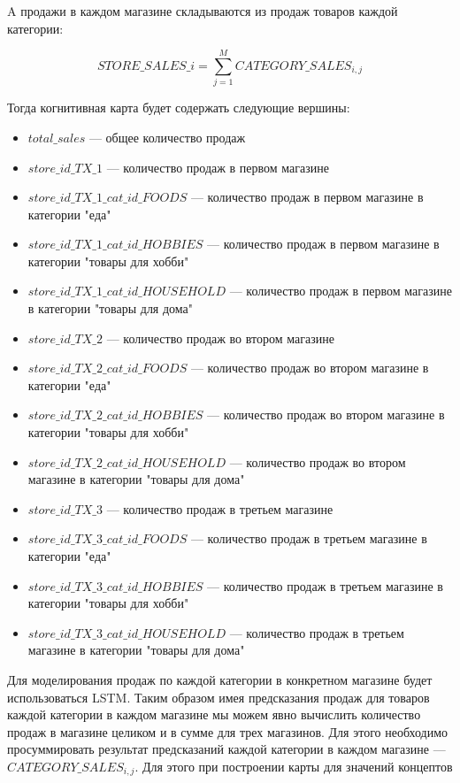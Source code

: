 \noindent A продажи в каждом магазине складываются из продаж
товаров каждой категории:

\begin{equation}\label{eq:store_sales_simple_model}
	STORE\_SALES\_{i} = \sum_{j=1}^{M} CATEGORY\_SALES_{i,j}
\end{equation}

Тогда когнитивная карта будет содержать следующие вершины:

\begin{itemize}
	\item $ total\_sales $ --- общее количество продаж
	\item $ store\_id\_TX\_1 $ --- количество продаж в первом магазине
	\item $ store\_id\_TX\_1\_cat\_id\_FOODS $ --- количество продаж в первом магазине в категории "еда"
	\item $ store\_id\_TX\_1\_cat\_id\_HOBBIES $ --- количество продаж в первом магазине в категории "товары для хобби"
	\item $ store\_id\_TX\_1\_cat\_id\_HOUSEHOLD $ --- количество продаж в первом магазине в категории "товары для дома"
	\item $ store\_id\_TX\_2 $ --- количество продаж во втором магазине
	\item $ store\_id\_TX\_2\_cat\_id\_FOODS $ --- количество продаж во втором магазине в категории "еда"
	\item $ store\_id\_TX\_2\_cat\_id\_HOBBIES $ --- количество продаж во втором магазине в категории "товары для хобби"
	\item $ store\_id\_TX\_2\_cat\_id\_HOUSEHOLD $ --- количество продаж во втором магазине в категории "товары для дома"
	\item $ store\_id\_TX\_3 $ --- количество продаж в третьем магазине
	\item $ store\_id\_TX\_3\_cat\_id\_FOODS $     --- количество продаж в третьем магазине в категории "еда"
	\item $ store\_id\_TX\_3\_cat\_id\_HOBBIES $   --- количество продаж в третьем магазине в категории "товары для хобби"
	\item $ store\_id\_TX\_3\_cat\_id\_HOUSEHOLD $ --- количество продаж в третьем магазине в категории "товары для дома"
\end{itemize}

Для моделирования продаж по каждой категории в конкретном магазине
будет использоваться LSTM.
Таким образом имея предсказания продаж для товаров каждой категории в каждом магазине
мы можем явно вычислить количество продаж в магазине целиком и в сумме для трех магазинов.
Для этого необходимо просуммировать результат предсказаний каждой категории
в каждом магазине --- $ CATEGORY\_SALES_{i,j} $.
Для этого при построении карты для значений концептов

